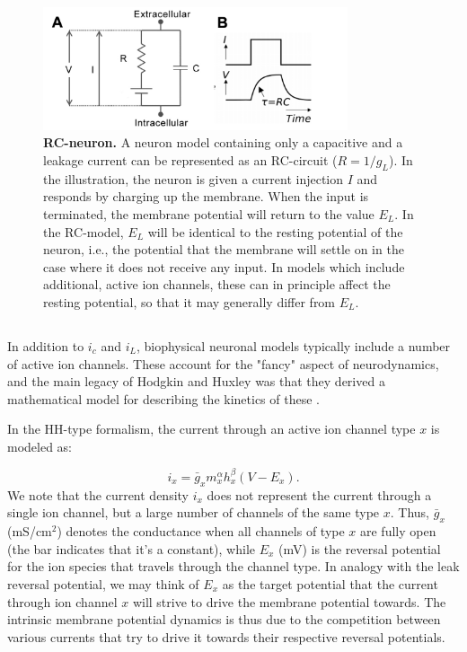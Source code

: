 \begin{figure}[!ht]
\begin{center}
\includegraphics[width=0.8\textwidth]{Figures/Neuron/RCneuron.png}
\end{center}
\caption{\textbf{RC-neuron.}  A neuron model containing only a capacitive and a leakage current can be represented as an RC-circuit ($R = 1/g_L$). In the illustration, the neuron is given a current injection $I$ and responds by charging up the membrane. When the input is terminated, the membrane potential will return to the value $E_L$. In the RC-model, $E_L$ will be identical to the resting potential of the neuron, i.e., the potential that the membrane will settle on in the case where it does not receive any input. In models which include additional, active ion channels, these can in principle affect the resting potential, so that it may generally differ from $E_L$.
}
\label{Neuron:fig:RC}
\end{figure}


\subsection{}
\label{sec:Neuron:active}
In addition to $i_c$ and $i_L$, biophysical neuronal models typically include a number of active ion channels. These account for the "fancy" aspect of neurodynamics, and the main legacy of Hodgkin and Huxley was that they derived a mathematical model for describing the kinetics of these \cite{Hodgkin1952}.

In the HH-type formalism, the current through an active ion channel type $x$ is modeled as:

\begin{equation}
i_x = \bar{g}_x m_x^{\alpha} h_x^{\beta}(V-E_x).
\label{Neuron:eq:HHform}
\end{equation}
We note that the current density $i_x$ does not represent the current through a single ion channel, but a large number of channels of the same type $x$. Thus, $\bar{g}_x$ (mS/cm$^2$) denotes the conductance when all channels of type $x$ are fully open (the bar indicates that it's a constant), while $E_x$ (mV) is the reversal potential for the ion species that travels through the channel type. In analogy with the leak reversal potential, we may think of $E_x$ as the target potential that the current through ion channel $x$ will strive to drive the membrane potential towards. The intrinsic membrane potential dynamics is thus due to the competition between various currents that try to drive it towards their respective reversal potentials. 

